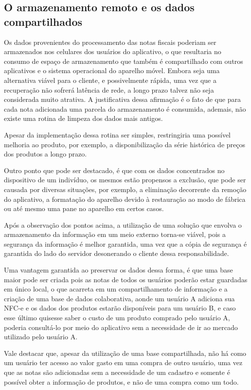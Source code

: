 \subsection{O armazenamento remoto e os dados compartilhados}

Os dados provenientes do processamento das notas fiscais poderiam ser armazenados nos celulares dos usuários do aplicativo, o que resultaria no consumo de espaço de armazenamento que também é compartilhado com outros aplicativos e o sistema operacional do aparelho móvel. Embora seja uma alternativa viável para o cliente, e possivelmente rápida, uma vez que a recuperação não sofrerá latência de rede, a longo prazo talvez não seja considerada muito atrativa. A justificativa dessa afirmação é o fato de que para cada nota adicionada uma parcela do armazenamento é consumida, ademais, não existe uma rotina de limpeza dos dados mais antigos.

Apesar da implementação dessa rotina ser simples, restringiria uma possível melhoria ao produto, por exemplo, a disponibilização da série histórica de preços dos produtos a longo prazo.

Outro ponto que pode ser destacado, é que com os dados concentrados no dispositivo de um indivíduo, os mesmos estão propensos a exclusão, que pode ser causada por diversas situações, por exemplo, a eliminação decorrente da remoção do aplicativo, a formatação do aparelho devido à restauração ao modo de fábrica ou até mesmo uma pane no aparelho em certos casos.

Após a observação dos pontos acima, a utilização de uma solução que envolva o armazenamento da informação em um meio externo torna-se viável, pois a segurança da informação é melhor garantida, uma vez que a cópia de segurança é garantida do lado do servidor desonerando o cliente dessa responsabilidade.

Uma vantagem garantida ao preservar os dados dessa forma, é que uma base maior pode ser criada pois as notas de todos os usuários poderão estar guardadas em único local, o que acarreta em um compartilhamento de informação e a criação de uma base de dados colaborativa, aonde um usuário A adiciona sua NFC-e e os dados dos produtos estarão disponíveis para um usuário B, e caso esse último quisesse saber o custo de um produto comprado pelo usuário A, poderia consultá-lo por meio do aplicativo sem a necessidade de ir ao mercado utilizado pelo usuário A.

Vale destacar que, apesar da utilização de uma base compartilhada, não há como um usuário ter acesso ao valor gasto em uma compra de outro usuário, uma vez que as notas são adicionadas sem a necessidade de um cadastro e somente é possível obter a informação de produtos, e não de uma compra como um todo.

